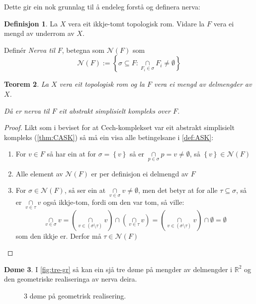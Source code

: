 \documentclass[a4paper, 12pt, norsk]{article}
\theoremstyle{plain}
\newtheorem{theorem}{Teorem}[section]
\theoremstyle{definition}
\newtheorem{definition}[theorem]{Definisjon}
\newtheorem{example}[theorem]{Døme}
\newcommand{\Rb}{\mathbb{R}}
\newcommand{\Nc}{\mathcal{N}}
\newcommand{\intersect}{ \mathop{\cap}\limits }
\newcommand{\set}[1]{ \left\{ #1 \right\} } %
\begin{document}
Dette gir ein nok grunnlag til å endeleg forstå og definera nerva:

\begin{definition}
	La $X$ vera eit ikkje-tomt topologisk rom. Vidare la $F$ vera ei mengd av underrom av $X$. 
	
	Definér \emph{Nerva til $F$}, betegna som $\Nc(F)$ som
	\begin{equation*}
		\Nc(F) := \left \{ \sigma \subseteq F : \intersect_{ F_i \in \sigma } F_i \neq \emptyset \right \}
	\end{equation*}
\end{definition}

\begin{theorem}
	La $X$ vera eit topologisk rom og la $F$ vera ei mengd av delmengder av $X$.
	
	Då er nerva til $F$ eit abstrakt simplisielt kompleks over $F$.
\end{theorem}

\begin{proof}
	Likt som i beviset for at Cech-komplekset var eit abstrakt simplisielt kompleks (\autoref{thm:CASK}) så må ein visa alle betingelsane i \autoref{def:ASK}:
	\begin{enumerate}
		\item{ 
			For \( v \in F \) så har ein at for \( \sigma = \set{ v } \) så er \( \intersect_{ p \in \sigma } p = v \neq \emptyset \), så \( \set{v} \in \Nc(F) \) 
		}
		\item{ 
			Alle element av \( \Nc(F) \) er per definisjon ei delmengd av \( F \)
		}
		\item{  
			For \( \sigma \in \Nc(F) \), så ser ein at \( \intersect_{v\in\sigma} v \neq \emptyset \), men det betyr at for alle \( \tau \subseteq \sigma \), så er \( \intersect_{v\in\tau} v \) også ikkje-tom, fordi om den var tom, så ville: 
			\[ 
				\intersect_{v\in\sigma} v = \left( \intersect_{v\in(\sigma\setminus\tau)} v \right) \intersect \left( \intersect_{v\in\tau} v \right) = \left( \intersect_{v\in(\sigma\setminus\tau)} v \right) \intersect \emptyset = \emptyset 
			\] 
			som den ikkje er. Derfor må \( \tau \in \Nc(F) \)
		}

	\end{enumerate}
\end{proof}

\begin{example}
	I \autoref{fig:tre-gr} så kan ein sjå tre døme på mengder av delmengder i \( \Rb^2 \) og den geometriske realiseringa av nerva deira.
	\begin{figure}[htbp]
		\begin{center}
			
		\end{center}
		\caption{3 døme på geometrisk realisering.}
		\label{fig:tre-gr}
	\end{figure}
\end{example}
\end{document}
